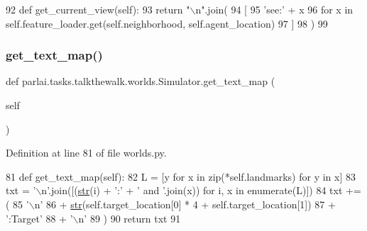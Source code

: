 \begin{DoxyCode}
92     \textcolor{keyword}{def }get\_current\_view(self):
93         \textcolor{keywordflow}{return} \textcolor{stringliteral}{"\(\backslash\)n"}.join(
94             [
95                 \textcolor{stringliteral}{'see:'} + x
96                 \textcolor{keywordflow}{for} x \textcolor{keywordflow}{in} self.feature\_loader.get(self.neighborhood, self.agent\_location)
97             ]
98         )
99 
\end{DoxyCode}
\mbox{\label{classparlai_1_1tasks_1_1talkthewalk_1_1worlds_1_1Simulator_ac582ca2c2642272362fdaf7acd5b4b81}} 
\subsubsection{\texorpdfstring{get\+\_\+text\+\_\+map()}{get\_text\_map()}}
{\footnotesize\ttfamily def parlai.\+tasks.\+talkthewalk.\+worlds.\+Simulator.\+get\+\_\+text\+\_\+map (\begin{DoxyParamCaption}\item[{}]{self }\end{DoxyParamCaption})}



Definition at line 81 of file worlds.\+py.


\begin{DoxyCode}
81     \textcolor{keyword}{def }get\_text\_map(self):
82         L = [y \textcolor{keywordflow}{for} x \textcolor{keywordflow}{in} zip(*self.landmarks) \textcolor{keywordflow}{for} y \textcolor{keywordflow}{in} x]
83         txt = \textcolor{stringliteral}{'\(\backslash\)n'}.join([(\hyperlink{namespacegenerate__task__READMEs_a5b88452ffb87b78c8c85ececebafc09f}{str}(i) + \textcolor{stringliteral}{':'} + \textcolor{stringliteral}{' and '}.join(x)) \textcolor{keywordflow}{for} i, x \textcolor{keywordflow}{in} enumerate(L)])
84         txt += (
85             \textcolor{stringliteral}{'\(\backslash\)n'}
86             + \hyperlink{namespacegenerate__task__READMEs_a5b88452ffb87b78c8c85ececebafc09f}{str}(self.target\_location[0] * 4 + self.target\_location[1])
87             + \textcolor{stringliteral}{':Target'}
88             + \textcolor{stringliteral}{'\(\backslash\)n'}
89         )
90         \textcolor{keywordflow}{return} txt
91 
\end{DoxyCode}
\mbox{\label{classparlai_1_1tasks_1_1talkthewalk_1_1worlds_1_1Simulator_a0bd93cb7b6958af1795e6c0adf47cb4d}} 

